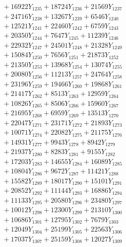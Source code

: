 \documentclass[a4paper,10pt]{article}
\begin{document}
{\begin{align}
&\;  + 16922 Y_{1235} + 18724 Y_{1236} + 21569 Y_{1237} \\[0.3ex]
&\;  + 24716 Y_{1238} + 13267 Y_{1239} + 6546 Y_{1240} \\[0.3ex]
&\;  + 12521 Y_{1241} + 22460 Y_{1242} + 6759 Y_{1243} \\[0.3ex]
&\;  + 20350 Y_{1244} + 7647 Y_{1245} + 11239 Y_{1246} \\[0.3ex]
&\;  + 22932 Y_{1247} + 24501 Y_{1248} + 21328 Y_{1249} \\[0.3ex]
&\;  + 15084 Y_{1250} + 7656 Y_{1251} + 21873 Y_{1252} \\[0.3ex]
&\;  + 21350 Y_{1253} + 13968 Y_{1254} + 13074 Y_{1255} \\[0.3ex]
&\;  + 20080 Y_{1256} + 11213 Y_{1257} + 24764 Y_{1258} \\[0.5ex]\allowbreak
&\;  + 23196 Y_{1259} + 19466 Y_{1260} + 19868 Y_{1261} \\[0.3ex]
&\;  + 21417 Y_{1262} + 8513 Y_{1263} + 12959 Y_{1264} \\[0.3ex]
&\;  + 10826 Y_{1265} + 8506 Y_{1266} + 15960 Y_{1267} \\[0.3ex]
&\;  + 21695 Y_{1268} + 6959 Y_{1269} + 13513 Y_{1270} \\[0.3ex]
&\;  + 22047 Y_{1271} + 23171 Y_{1272} + 21893 Y_{1273} \\[0.3ex]
&\;  + 10071 Y_{1274} + 22082 Y_{1275} + 21175 Y_{1276} \\[0.3ex]
&\;  + 14931 Y_{1277} + 9943 Y_{1278} + 8942 Y_{1279} \\[0.3ex]
&\;  + 21937 Y_{1280} + 8283 Y_{1281} + 9155 Y_{1282} \\[0.3ex]
&\;  + 17203 Y_{1283} + 14655 Y_{1284} + 16089 Y_{1285} \\[0.3ex]
&\;  + 10804 Y_{1286} + 9672 Y_{1287} + 11421 Y_{1288} \\[0.5ex]\allowbreak
&\;  + 15582 Y_{1289} + 18017 Y_{1290} + 15101 Y_{1291} \\[0.3ex]
&\;  + 20852 Y_{1292} + 11144 Y_{1293} + 16886 Y_{1294} \\[0.3ex]
&\;  + 11133 Y_{1295} + 20580 Y_{1296} + 23480 Y_{1297} \\[0.3ex]
&\;  + 10012 Y_{1298} + 12300 Y_{1299} + 21310 Y_{1300} \\[0.3ex]
&\;  + 10686 Y_{1301} + 12795 Y_{1302} + 7679 Y_{1303} \\[0.3ex]
&\;  + 12049 Y_{1304} + 25199 Y_{1305} + 22563 Y_{1306} \\[0.3ex]
&\;  + 17037 Y_{1307} + 25159 Y_{1308} + 12027 Y_{1309} \\[0.3ex]

\end{align}}
\end{document}
